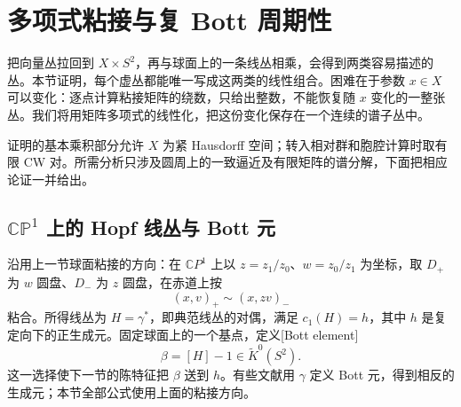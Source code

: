 
% 
% 
% 
% 
% 
% 
% 
% 
% 

\section{多项式粘接与复 Bott 周期性}
\label{g2:sec:2403}

把向量丛拉回到 \(X\times S^2\)，再与球面上的一条线丛相乘，会得到两类容易描述的丛。本节证明，每个虚丛都能唯一写成这两类的线性组合。困难在于参数 \(x\in X\) 可以变化：逐点计算粘接矩阵的绕数，只给出整数，不能恢复随 \(x\) 变化的一整张丛。我们将用矩阵多项式的线性化，把这份变化保存在一个连续的谱子丛中。

证明的基本乘积部分允许 \(X\) 为紧 Hausdorff 空间；转入相对群和胞腔计算时取有限 CW 对。所需分析只涉及圆周上的一致逼近及有限矩阵的谱分解，下面把相应论证一并给出。

\subsection{\texorpdfstring{\(\mathbb{CP}^1\) 上的 Hopf 线丛与 Bott 元}{CP¹ 上的 Hopf 线丛与 Bott 元}}
\label{g2:subsec:2403:01}
沿用上一节球面粘接的方向：在 \(\mathbb CP^1\) 上以 \(z=z_1/z_0\)、\(w=z_0/z_1\) 为坐标，取 \(D_+\) 为 \(w\) 圆盘、\(D_-\) 为 \(z\) 圆盘，在赤道上按
\[
	(x,v)_+\sim(x,zv)_-
\]
粘合。所得线丛为 \(H=\gamma^*\)，即典范线丛的对偶，满足 \(c_1(H)=h\)，其中 \(h\) 是复定向下的正生成元。固定球面上的一个基点，定义[Bott element]
\[
	\beta=[H]-1\in\widetilde K^0(S^2).
\]
这一选择使下一节的陈特征把 \(\beta\) 送到 \(h\)。有些文献用 \(\gamma\) 定义 Bott 元，得到相反的生成元；本节全部公式使用上面的粘接方向。

